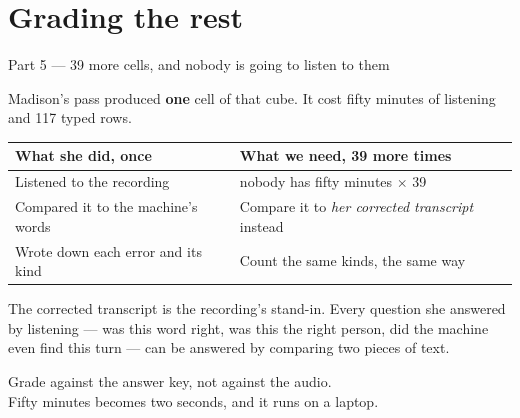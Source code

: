 \documentclass[aspectratio=169]{beamer}
\newcommand{\bigidea}[1]{%
  \vfill
  \begingroup\centering
  \colorbox{warmbg}{\parbox{0.93\textwidth}{\centering \large #1}}%
  \par\endgroup
  \vfill}
\newenvironment{nicetable}[1]
  {\par\vspace{2pt}\begingroup\centering\small
   \renewcommand{\arraystretch}{1.18}%
   \setlength{\tabcolsep}{6pt}\rowcolors{2}{band}{white}%
   \begin{tabular}{#1}\arrayrulecolor{hdr}\toprule}
  {\bottomrule\end{tabular}\par\endgroup\vspace{2pt}}
\newcommand{\hd}[1]{\textcolor{hdr}{\textbf{#1}}}
\begin{document}
\section{Grading the rest}
\begin{frame}{Part 5 --- 39 more cells, and nobody is going to listen to them}

Madison's pass produced \textbf{one} cell of that cube. It cost fifty minutes of listening
and 117 typed rows.

\begin{nicetable}{p{5.6cm}p{6.6cm}}
\hd{What she did, once} & \hd{What we need, 39 more times} \\ \midrule
Listened to the recording & \textcolor{warm}{nobody has fifty minutes $\times$ 39} \\
Compared it to the machine's words & Compare it to \emph{her corrected transcript} instead \\
Wrote down each error and its kind & Count the same kinds, the same way \\
\end{nicetable}

\vspace{0.2em}
The corrected transcript is the recording's stand-in. Every question she answered by
listening --- was this word right, was this the right person, did the machine even find
this turn --- can be answered by comparing two pieces of text.

\bigidea{Grade against the answer key, not against the audio.\\[3pt]
Fifty minutes becomes two seconds, and it runs on a laptop.}

\end{frame}
\end{document}
